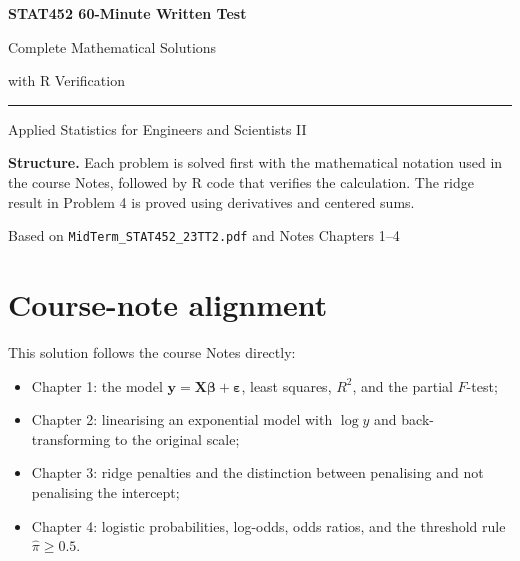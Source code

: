 ﻿\documentclass[11pt]{article}
\newcommand{\Rtwo}{R^2}
\begin{document}
\hypersetup{pageanchor=false}

\begin{titlepage}
  \centering
  \vspace*{1.0in}
  {\sffamily\color{navy}\Huge\bfseries STAT452 60-Minute Written Test\par}
  \vspace{0.25in}
  {\sffamily\color{teal}\LARGE Complete Mathematical Solutions\par}
  \vspace{0.16in}
  {\sffamily\Large with R Verification\par}
  \vspace{0.5in}
  {\color{navy!45}\rule{0.78\textwidth}{1.1pt}\par}
  \vspace{0.5in}
  {\Large Applied Statistics for Engineers and Scientists II\par}
  \vfill
  \begin{minipage}{0.82\textwidth}
    \colorbox{navy!7}{\parbox{0.94\linewidth}{
      \textbf{Structure.} Each problem is solved first with the mathematical
      notation used in the course Notes, followed by R code that verifies the
      calculation. The ridge result in Problem 4 is proved using derivatives
      and centered sums.
    }}
  \end{minipage}
  \vfill
  {\sffamily\small Based on \texttt{MidTerm\_STAT452\_23TT2.pdf} and Notes Chapters 1--4\par}
\end{titlepage}

\hypersetup{pageanchor=true}
\tableofcontents
\clearpage
{}

\section*{Course-note alignment}

This solution follows the course Notes directly:

\begin{itemize}
  \item Chapter 1: the model $\bm y=\bm X\bm\beta+\bm\varepsilon$,
  least squares, $\Rtwo$, and the partial $F$-test;
  \item Chapter 2: linearising an exponential model with $\log y$ and
  back-transforming to the original scale;
  \item Chapter 3: ridge penalties and the distinction between penalising and
  not penalising the intercept;
  \item Chapter 4: logistic probabilities, log-odds, odds ratios, and the
  threshold rule $\widehat\pi\ge 0.5$.
\end{itemize}
\end{document}
